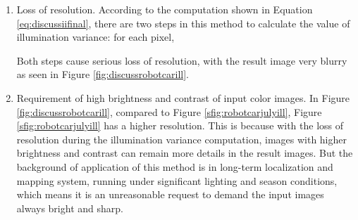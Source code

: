 \begin{enumerate}[1.]
	\item Loss of resolution. According to the computation shown in Equation \ref{eq:discussiifinal}, there are two steps in this method to calculate the value of illumination variance: for each pixel, 
	Both steps cause serious loss of resolution, with the result image very blurry as seen in Figure \ref{fig:discussrobotcarill}. 
	
	\item Requirement of high brightness and contrast of input color images. In Figure \ref{fig:discussrobotcarill}, compared to Figure \ref{sfig:robotcarjulyill}, Figure \ref{sfig:robotcarjulyill} has a higher resolution. This is because with the loss of resolution during the illumination variance computation, images with higher brightness and contrast can remain more details in the result images. But the background of application of this method is in long-term localization and mapping system, running under significant lighting and season conditions, which means it is an unreasonable request to demand the input images always bright and sharp.
	
\end{enumerate}


